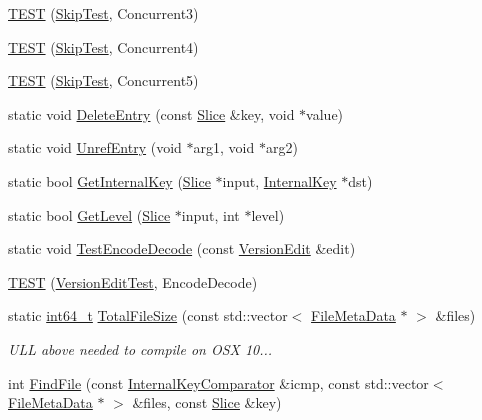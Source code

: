 \begin{DoxyCompactItemize}
\item 
\hyperlink{namespaceleveldb_a95f25d807cc1b1a16a34f9a3a24fb7bc}{T\+E\+S\+T} (\hyperlink{classleveldb_1_1_skip_test}{Skip\+Test}, Concurrent3)
\item 
\hyperlink{namespaceleveldb_a491925bfd0a0eb00edbbbbc0f1d3c0c9}{T\+E\+S\+T} (\hyperlink{classleveldb_1_1_skip_test}{Skip\+Test}, Concurrent4)
\item 
\hyperlink{namespaceleveldb_ae94270b577d135677ad028bef3170a16}{T\+E\+S\+T} (\hyperlink{classleveldb_1_1_skip_test}{Skip\+Test}, Concurrent5)
\item 
static void \hyperlink{namespaceleveldb_ae1152d734df7c3bdf050111f0049cd7c}{Delete\+Entry} (const \hyperlink{classleveldb_1_1_slice}{Slice} \&key, void $\ast$value)
\item 
static void \hyperlink{namespaceleveldb_a623e7ee79df088f3d37ebf5b55c906ba}{Unref\+Entry} (void $\ast$arg1, void $\ast$arg2)
\item 
static bool \hyperlink{namespaceleveldb_a83eb9464b52905f9a56f8f0d5437c3c2}{Get\+Internal\+Key} (\hyperlink{classleveldb_1_1_slice}{Slice} $\ast$input, \hyperlink{classleveldb_1_1_internal_key}{Internal\+Key} $\ast$dst)
\item 
static bool \hyperlink{namespaceleveldb_afc2dfe267c7cd8d678021e2752f336e9}{Get\+Level} (\hyperlink{classleveldb_1_1_slice}{Slice} $\ast$input, int $\ast$level)
\item 
static void \hyperlink{namespaceleveldb_a435e5ce2b770dd30fffe979090145e0e}{Test\+Encode\+Decode} (const \hyperlink{classleveldb_1_1_version_edit}{Version\+Edit} \&edit)
\item 
\hyperlink{namespaceleveldb_aa3106d7d6e907fc13c8c7ceed76740ad}{T\+E\+S\+T} (\hyperlink{classleveldb_1_1_version_edit_test}{Version\+Edit\+Test}, Encode\+Decode)
\item 
static \hyperlink{stdint_8h_adec1df1b8b51cb32b77e5b86fff46471}{int64\+\_\+t} \hyperlink{namespaceleveldb_a8d7291b08be6643bcfb46c475f779f9e}{Total\+File\+Size} (const std\+::vector$<$ \hyperlink{structleveldb_1_1_file_meta_data}{File\+Meta\+Data} $\ast$ $>$ \&files)
\begin{DoxyCompactList}\small\item\em U\+L\+L above needed to compile on O\+S\+X 10... \end{DoxyCompactList}\item 
int \hyperlink{namespaceleveldb_a812c4c6cf8299e767535a59f2205df0c}{Find\+File} (const \hyperlink{classleveldb_1_1_internal_key_comparator}{Internal\+Key\+Comparator} \&icmp, const std\+::vector$<$ \hyperlink{structleveldb_1_1_file_meta_data}{File\+Meta\+Data} $\ast$ $>$ \&files, const \hyperlink{classleveldb_1_1_slice}{Slice} \&key)

\end{DoxyCompactItemize}
